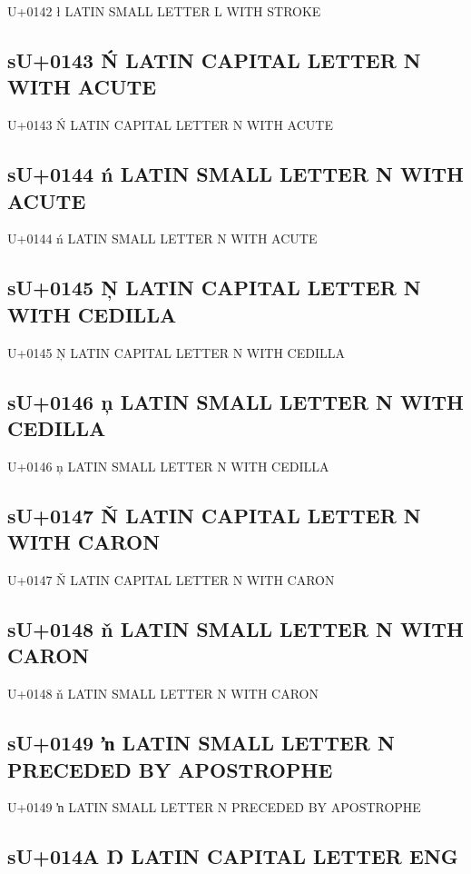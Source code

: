 U+0142 ł  LATIN SMALL LETTER L WITH STROKE

\subsection{sU+0143 Ń  LATIN CAPITAL LETTER N WITH ACUTE}

U+0143 Ń  LATIN CAPITAL LETTER N WITH ACUTE

\subsection{sU+0144 ń  LATIN SMALL LETTER N WITH ACUTE}

U+0144 ń  LATIN SMALL LETTER N WITH ACUTE

\subsection{sU+0145 Ņ  LATIN CAPITAL LETTER N WITH CEDILLA}

U+0145 Ņ  LATIN CAPITAL LETTER N WITH CEDILLA

\subsection{sU+0146 ņ  LATIN SMALL LETTER N WITH CEDILLA}

U+0146 ņ  LATIN SMALL LETTER N WITH CEDILLA

\subsection{sU+0147 Ň  LATIN CAPITAL LETTER N WITH CARON}

U+0147 Ň  LATIN CAPITAL LETTER N WITH CARON

\subsection{sU+0148 ň  LATIN SMALL LETTER N WITH CARON}

U+0148 ň  LATIN SMALL LETTER N WITH CARON

\subsection{sU+0149 ŉ LATIN SMALL LETTER N PRECEDED BY APOSTROPHE}

U+0149 ŉ LATIN SMALL LETTER N PRECEDED BY APOSTROPHE

\subsection{sU+014A Ŋ  LATIN CAPITAL LETTER ENG}

